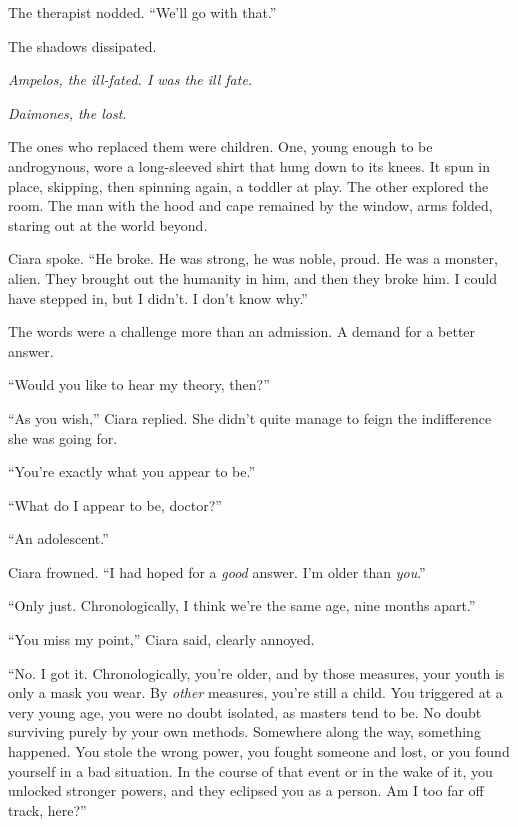 The therapist nodded.  ``We'll go with that.''



The shadows dissipated.



\emph{Ampelos, the ill-fated.  I was the ill fate.}



\emph{Daimones, the lost.}



The ones who replaced them were children.  One, young enough to be androgynous, wore a long-sleeved shirt that hung down to its knees.  It spun in place, skipping, then spinning again, a toddler at play.  The other explored the room.  The man with the hood and cape remained by the window, arms folded, staring out at the world beyond.



Ciara spoke.  ``He broke.  He was strong, he was noble, proud.  He was a monster, alien.  They brought out the humanity in him, and then they broke him.  I could have stepped in, but I didn't.  I don't know why.''



The words were a challenge more than an admission.  A demand for a better answer.



``Would you like to hear my theory, then?''



``As you wish,'' Ciara replied.  She didn't quite manage to feign the indifference she was going for.



``You're exactly what you appear to be.''



``What do I appear to be, doctor?''



``An adolescent.''



Ciara frowned.  ``I had hoped for a \emph{good} answer.  I'm older than \emph{you}.''



``Only just.  Chronologically, I think we're the same age, nine months apart.''



``You miss my point,'' Ciara said, clearly annoyed.



``No.  I got it.  Chronologically, you're older, and by those measures, your youth is only a mask you wear.  By \emph{other} measures, you're still a child.  You triggered at a very young age, you were no doubt isolated, as masters tend to be.  No doubt surviving purely by your own methods.  Somewhere along the way, something happened.  You stole the wrong power, you fought someone and lost, or you found yourself in a bad situation.  In the course of that event or in the wake of it, you unlocked stronger powers, and they eclipsed you as a person.  Am I too far off track, here?''



